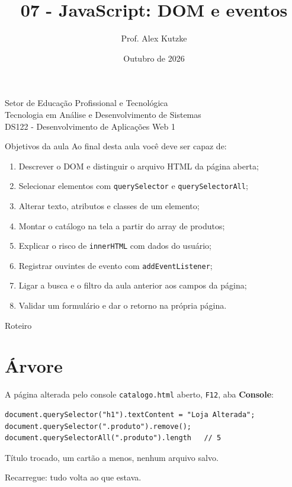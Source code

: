 \documentclass{beamer}
\title{07 - JavaScript: DOM e eventos}
\author{Prof. Alex Kutzke}
\date{Outubro de 2026}
\begin{document}
\begin{frame}
	\begin{center}
		\large{Setor de Educação Profissional e Tecnológica}\\
		Tecnologia em Análise e Desenvolvimento de Sistemas\\
		\vspace{1cm}
		\small{DS122 - Desenvolvimento de Aplicações Web 1}
	\end{center}
	\titlepage
\end{frame}

\begin{frame}{Objetivos da aula}
	Ao final desta aula você deve ser capaz de:
	\begin{enumerate}
		\item Descrever o DOM e distinguir o arquivo HTML da página aberta;
		\item Selecionar elementos com \texttt{querySelector} e
		      \texttt{querySelectorAll};
		\item Alterar texto, atributos e classes de um elemento;
		\item Montar o catálogo na tela a partir do array de produtos;
		\item Explicar o risco de \texttt{innerHTML} com dados do usuário;
		\item Registrar ouvintes de evento com \texttt{addEventListener};
		\item Ligar a busca e o filtro da aula anterior aos campos da página;
		\item Validar um formulário e dar o retorno na própria página.
	\end{enumerate}
\end{frame}

\begin{frame}{Roteiro}
	\tableofcontents
\end{frame}

\section{Árvore}

\begin{frame}[fragile]{A página alterada pelo console}
	\texttt{catalogo.html} aberto, \texttt{F12}, aba \textbf{Console}:

	\begin{verbatim}
document.querySelector("h1").textContent = "Loja Alterada";
document.querySelector(".produto").remove();
document.querySelectorAll(".produto").length   // 5
	\end{verbatim}

	\vspace{0.3cm}
	Título trocado, um cartão a menos, nenhum arquivo salvo.

	\vspace{0.3cm}
	Recarregue: tudo volta ao que estava.
\end{frame}
\end{document}
